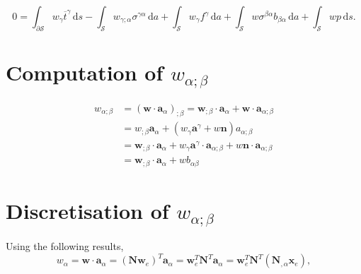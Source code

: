     \begin{equation}\label{eq:wear_7}
    0 = \int_{\partial \mathcal{S}} w_{\gamma} \overline{t}^{\gamma} \, \mathrm{d} s - \int_{\mathcal{S}} w_{\gamma ; \alpha} \sigma^{\gamma \alpha} \, \mathrm{d} a + \int_{\mathcal{S}} w_{\gamma} f^{\gamma} \, \mathrm{d} a + \int_{\mathcal{S}} w \sigma^{\beta \alpha} b_{\beta \alpha} \, \mathrm{d} a + \int_{\mathcal{S}} w p \, \mathrm{d} s.
    \end{equation}
\section{Computation of \texorpdfstring{$w_{\alpha ; \beta}$}{w-a;b}}
    \begin{equation}\label{appendices:w_ab}
        \begin{split}
            w_{\alpha ; \beta} &= \left( \boldsymbol{w} \cdot \boldsymbol{a}_{\alpha} \right)_{; \beta} = \boldsymbol{w}_{; \beta} \cdot \boldsymbol{a}_{\alpha} + \boldsymbol{w} \cdot \boldsymbol{a}_{\alpha ; \beta} \\ &= w_{; \beta} \boldsymbol{a}_{\alpha} + \left( w_{\gamma} \boldsymbol{a}^{\gamma} + w \boldsymbol{n} \right) a_{\alpha ; \beta} \\ &= \boldsymbol{w}_{; \beta} \cdot \boldsymbol{a}_{\alpha} + w_{\gamma} \boldsymbol{a}^{\gamma} \cdot \boldsymbol{a}_{\alpha ; \beta} + w \boldsymbol{n} \cdot \boldsymbol{a}_{\alpha ; \beta} \\ &= \boldsymbol{w}_{; \beta} \cdot \boldsymbol{a}_{\alpha} + w b_{\alpha \beta}
        \end{split}
    \end{equation}

\section{Discretisation of \texorpdfstring{$w_{\alpha ; \beta}$}{w-a;b}}
Using the following results,
\begin{equation}\label{eq:w_alp}
        w_{\alpha} = \boldsymbol{w} \cdot \boldsymbol{a}_{\alpha} = \left( \mathbf{N} \mathbf{w}_{e} \right)^{T} \boldsymbol{a}_{\alpha} = \mathbf{w}_{e}^{T} \mathbf{N}^{T} \boldsymbol{a}_{\alpha} = \mathbf{w}_{e}^{T} \mathbf{N}^{T} \left( \mathbf{N}_{, \alpha} \mathbf{x}_{e} \right),
    \end{equation}

